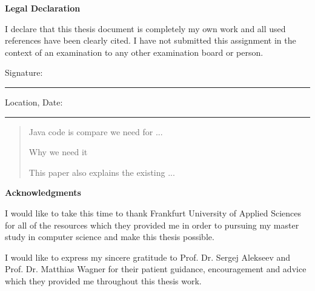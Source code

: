 \documentclass{report}
\begin{document}
\doublespacing
\null\vfil
\begin{center}{\huge\bf Legal Declaration\par}\end{center}
\null
I declare that this thesis document is completely my own work and all used references have been clearly cited. I have not submitted this assignment in the context of an examination to any other examination board or person.\\[2.5cm]

\begin{flushleft}
Signature:\\
\rule[1em]{25em}{0.5pt} %
 
Location, Date:\\
\rule[1em]{25em}{0.5pt} %
\end{flushleft}


\newpage
\pagestyle{fancy}
\fancyhead{}
\renewcommand{\headrulewidth}{0pt}
\renewcommand{\footrulewidth}{0.4pt}
\begin{abstract}
\large
Java code is compare we need for ...

\par Why we need it


\par This paper also explains the existing ...
\end{abstract}

\newpage
\begin{center}{\huge\bf Acknowledgments\par}\end{center}
\null
I would like to take this time to thank Frankfurt University of Applied Sciences for all of the resources which they provided me in order to pursuing my master study in computer science and make this thesis possible.\vspace{5 mm}

\noindent I would like to express my sincere gratitude to Prof. Dr. Sergej Alekseev and Prof. Dr. Matthias Wagner for their patient guidance, encouragement and advice which they provided me throughout this thesis work.
\end{document}
